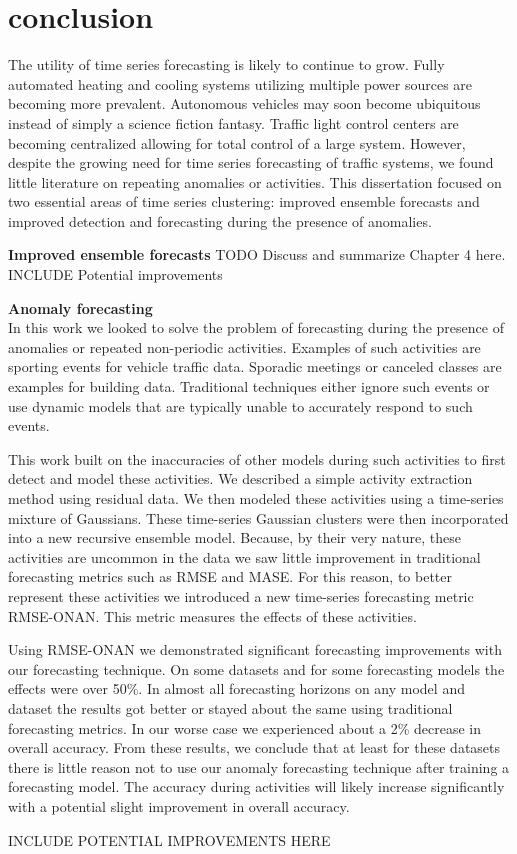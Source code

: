 \chapter{conclusion}

The utility of time series forecasting is likely to continue to grow.  Fully automated heating and cooling systems utilizing multiple power sources are becoming more prevalent.  Autonomous vehicles may soon become ubiquitous instead of simply a science fiction fantasy.  Traffic light control centers are becoming centralized allowing for total control of a large system.  However, despite the growing need for time series forecasting of traffic systems, we found little literature on repeating anomalies or activities.  This dissertation focused on two essential areas of time series clustering: improved ensemble forecasts and improved detection and forecasting during the presence of anomalies.  

\bigskip
\noindent \textbf{Improved ensemble forecasts}
TODO Discuss and summarize Chapter 4 here.
INCLUDE Potential improvements

 \bigskip
\noindent \textbf{Anomaly forecasting}\\
In this work we looked to solve the problem of forecasting during the presence of anomalies or repeated non-periodic activities.  Examples of such activities are sporting events for vehicle traffic data.  Sporadic meetings or canceled classes are examples for building data.  Traditional techniques either ignore such events or use dynamic models that are typically unable to accurately respond to such events.  

This work built on the inaccuracies of other models during such activities to first detect and model these activities.  We described a simple activity extraction method using residual data.  We then modeled these activities using a time-series mixture of Gaussians.  These time-series Gaussian clusters were then incorporated into a new recursive ensemble model.  Because, by their very nature, these activities are uncommon in the data we saw little improvement in traditional forecasting metrics such as RMSE and MASE.  For this reason, to better represent these activities we introduced a new time-series forecasting metric RMSE-ONAN.  This metric measures the effects of these activities.  

Using RMSE-ONAN we demonstrated significant forecasting improvements with our forecasting technique.  On some datasets and for some forecasting models the effects were over 50\%.  In almost all forecasting horizons on any model and dataset the results got better or stayed about the same using traditional forecasting metrics.  In our worse case we experienced about a 2\% decrease in overall accuracy.  From these results, we conclude that at least for these datasets there is little reason not to use our anomaly forecasting technique after training a forecasting model.  The accuracy during activities will likely increase significantly with a potential slight improvement in overall accuracy.

INCLUDE POTENTIAL IMPROVEMENTS HERE
